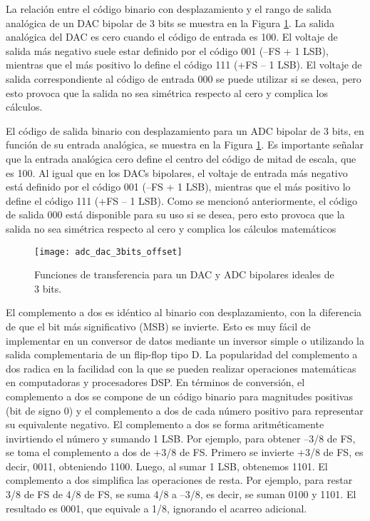     La relación entre el código binario con desplazamiento y el rango de salida analógica de un DAC bipolar de 3 bits se muestra en la Figura \ref{fig:adc_dac_3bits_offset}. La salida analógica del DAC es cero cuando el código de entrada es 100. El voltaje de salida más negativo suele estar definido por el código 001 (–FS + 1 LSB), mientras que el más positivo lo define el código 111 (+FS – 1 LSB). El voltaje de salida correspondiente al código de entrada 000 se puede utilizar si se desea, pero esto provoca que la salida no sea simétrica respecto al cero y complica los cálculos.

    El código de salida binario con desplazamiento para un ADC bipolar de 3 bits, en función de su entrada analógica, se muestra en la Figura \ref{fig:adc_dac_3bits_offset}. Es importante señalar que la entrada analógica cero define el centro del código de mitad de escala, que es 100. Al igual que en los DACs bipolares, el voltaje de entrada más negativo está definido por el código 001 (–FS + 1 LSB), mientras que el más positivo lo define el código 111 (+FS – 1 LSB). Como se mencionó anteriormente, el código de salida 000 está disponible para su uso si se desea, pero esto provoca que la salida no sea simétrica respecto al cero y complica los cálculos matemáticos

    \begin{figure}[!h]
      \centering
      \texttt{[image: adc\_dac\_3bits\_offset]}
      \caption{Funciones de transferencia para un DAC y ADC bipolares ideales de 3 bits.}
      \label{fig:adc_dac_3bits_offset}
    \end{figure}

    El complemento a dos es idéntico al binario con desplazamiento, con la diferencia de que el bit más significativo (MSB) se invierte. Esto es muy fácil de implementar en un conversor de datos mediante un inversor simple o utilizando la salida complementaria de un flip-flop tipo D. La popularidad del complemento a dos radica en la facilidad con la que se pueden realizar operaciones matemáticas en computadoras y procesadores DSP. En términos de conversión, el complemento a dos se compone de un código binario para magnitudes positivas (bit de signo 0) y el complemento a dos de cada número positivo para representar su equivalente negativo. El complemento a dos se forma aritméticamente invirtiendo el número y sumando 1 LSB. Por ejemplo, para obtener –3/8 de FS, se toma el complemento a dos de +3/8 de FS. Primero se invierte +3/8 de FS, es decir, 0011, obteniendo 1100. Luego, al sumar 1 LSB, obtenemos 1101. El complemento a dos simplifica las operaciones de resta. Por ejemplo, para restar 3/8 de FS de 4/8 de FS, se suma 4/8 a –3/8, es decir, se suman 0100 y 1101. El resultado es 0001, que equivale a 1/8, ignorando el acarreo adicional.

